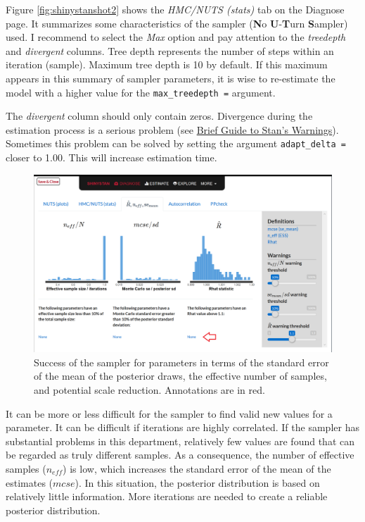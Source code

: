 \documentclass[
  english,
  doc]{apa6}
\begin{document}
Figure \ref{fig:shinystanshot2} shows the \emph{HMC/NUTS (stats)} tab on the Diagnose page. It summarizes some characteristics of the sampler (\textbf{N}o \textbf{U}-\textbf{T}urn \textbf{S}ampler) used. I recommend to select the \emph{Max} option and pay attention to the \emph{treedepth} and \emph{divergent} columns. Tree depth represents the number of steps within an iteration (sample). Maximum tree depth is 10 by default. If this maximum appears in this summary of sampler parameters, it is wise to re-estimate the model with a higher value for the \texttt{max\_treedepth\ =} argument.

The \emph{divergent} column should only contain zeros. Divergence during the estimation process is a serious problem (see \href{https://mc-stan.org/misc/warnings.html\#divergent-transitions-after-warmup}{Brief Guide to Stan's Warnings}). Sometimes this problem can be solved by setting the argument \texttt{adapt\_delta\ =} closer to 1.00. This will increase estimation time.

\begin{figure}[H]
\includegraphics[width=1\linewidth]{shinystan3} \caption{Success of the sampler for parameters in terms of the standard error of the mean of the posterior draws, the effective number of samples, and potential scale reduction. Annotations are in red.}\label{fig:shinystanshot3}
\end{figure}

It can be more or less difficult for the sampler to find valid new values for a parameter. It can be difficult if iterations are highly correlated. If the sampler has substantial problems in this department, relatively few values are found that can be regarded as truly different samples. As a consequence, the number of effective samples (\(n_{eff}\)) is low, which increases the standard error of the mean of the estimates (\(mcse\)). In this situation, the posterior distribution is based on relatively little information. More iterations are needed to create a reliable posterior distribution.
\end{document}
